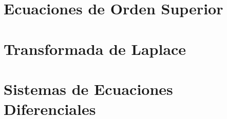 \documentclass[
12pt,
]{tufte-book}
\begin{document}
\chapter{Ecuaciones de Orden Superior}








\chapter{Transformada de Laplace}






\chapter{Sistemas de Ecuaciones Diferenciales}




%
{}

\end{document}
